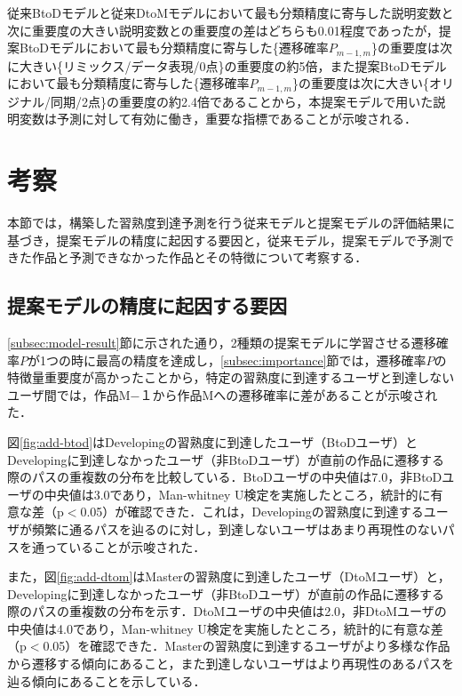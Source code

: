 \documentclass[11pt,dvipdfmx]{jreport}
\begin{document}
従来BtoDモデルと従来DtoMモデルにおいて最も分類精度に寄与した説明変数と次に重要度の大きい説明変数との重要度の差はどちらも0.01程度であったが，提案BtoDモデルにおいて最も分類精度に寄与した\{遷移確率$P_{m-1,m}$\}の重要度は次に大きい\{リミックス/データ表現/0点\}の重要度の約5倍，また提案BtoDモデルにおいて最も分類精度に寄与した\{遷移確率$P_{m-1,m}$\}の重要度は次に大きい\{オリジナル/同期/2点\}の重要度の約2.4倍であることから，本提案モデルで用いた説明変数は予測に対して有効に働き，重要な指標であることが示唆される．


\section{考察}

本節では，構築した習熟度到達予測を行う従来モデルと提案モデルの評価結果に基づき，提案モデルの精度に起因する要因と，従来モデル，提案モデルで予測できた作品と予測できなかった作品とその特徴について考察する．

\subsection{提案モデルの精度に起因する要因}

\ref{subsec:model-result}節に示された通り，2種類の提案モデルに学習させる遷移確率$P$が1つの時に最高の精度を達成し，\ref{subsec:importance}節では，遷移確率$P$の特徴量重要度が高かったことから，特定の習熟度に到達するユーザと到達しないユーザ間では，作品M−１から作品Mへの遷移確率に差があることが示唆された．

図\ref{fig:add-btod}はDevelopingの習熟度に到達したユーザ（BtoDユーザ）とDevelopingに到達しなかったユーザ（非BtoDユーザ）が直前の作品に遷移する際のパスの重複数の分布を比較している．BtoDユーザの中央値は7.0，非BtoDユーザの中央値は3.0であり，Man-whitney U検定を実施したところ，統計的に有意な差（p$<$0.05）が確認できた．これは，Developingの習熟度に到達するユーザが頻繁に通るパスを辿るのに対し，到達しないユーザはあまり再現性のないパスを通っていることが示唆された．

また，図\ref{fig:add-dtom}はMasterの習熟度に到達したユーザ（DtoMユーザ）と，Developingに到達しなかったユーザ（非BtoDユーザ）が直前の作品に遷移する際のパスの重複数の分布を示す．DtoMユーザの中央値は2.0，非DtoMユーザの中央値は4.0であり，Man-whitney U検定を実施したところ，統計的に有意な差（p$<$0.05）を確認できた．Masterの習熟度に到達するユーザがより多様な作品から遷移する傾向にあること，また到達しないユーザはより再現性のあるパスを辿る傾向にあることを示している．
\end{document}
